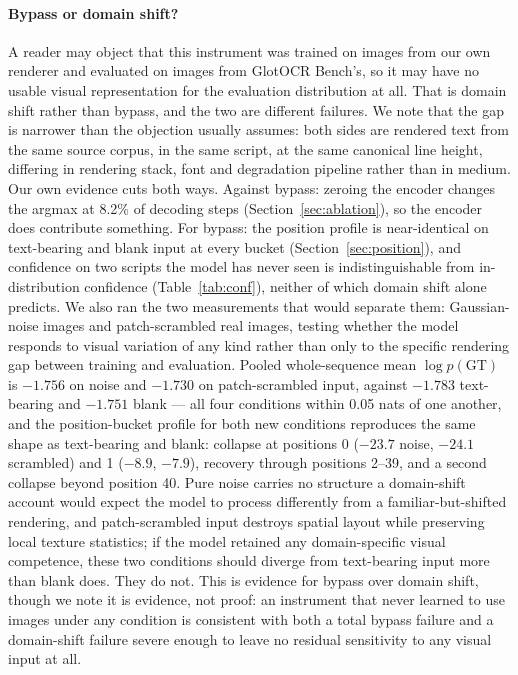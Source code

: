 \documentclass{article}
\begin{document}
\paragraph{Bypass or domain shift?} A reader may object that this instrument was trained on
images from our own renderer and evaluated on images from GlotOCR Bench's, so it may have no
usable visual representation for the evaluation distribution at all. That is domain shift
rather than bypass, and the two are different failures. We note that the gap is narrower than
the objection usually assumes: both sides are rendered text from the same source corpus, in the
same script, at the same canonical line height, differing in rendering stack, font and
degradation pipeline rather than in medium. Our own evidence cuts
both ways. Against bypass: zeroing the encoder changes the argmax at 8.2\% of decoding steps
(Section~\ref{sec:ablation}), so the encoder does contribute something. For bypass: the
position profile is near-identical on text-bearing and blank input at every bucket
(Section~\ref{sec:position}), and confidence on two scripts the model has never seen is
indistinguishable from in-distribution confidence (Table~\ref{tab:conf}), neither of which
domain shift alone predicts. We also ran the two measurements that would separate them:
Gaussian-noise images and patch-scrambled real images, testing whether the model responds to
visual variation of any kind rather than only to the specific rendering gap between training
and evaluation. Pooled whole-sequence mean $\log p(\mathrm{GT})$ is $-1.756$ on noise and
$-1.730$ on patch-scrambled input, against $-1.783$ text-bearing and $-1.751$ blank --- all four
conditions within 0.05 nats of one another, and the position-bucket profile for both new
conditions reproduces the same shape as text-bearing and blank: collapse at positions 0
($-23.7$ noise, $-24.1$ scrambled) and 1 ($-8.9$, $-7.9$), recovery through positions 2--39, and
a second collapse beyond position 40. Pure noise carries no structure a domain-shift account
would expect the model to process differently from a familiar-but-shifted rendering, and
patch-scrambled input destroys spatial layout while preserving local texture statistics; if the
model retained any domain-specific visual competence, these two conditions should diverge from
text-bearing input more than blank does. They do not. This is evidence for bypass over domain
shift, though we note it is evidence, not proof: an instrument that never learned to use images
under any condition is consistent with both a total bypass failure and a domain-shift failure
severe enough to leave no residual sensitivity to any visual input at all.
\end{document}
